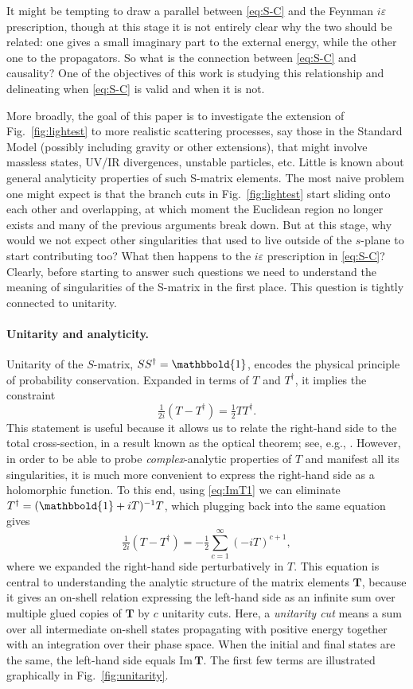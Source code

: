 \documentclass[12pt]{article}
\newcommand*{\boldone}{\mathbbold{1}}
\numberwithin{figure}{section}
\def \be {\begin{equation}}
\def \ee {\end{equation}}
\def \eps {\varepsilon}
\def \Im {\mathrm{Im}}
\begin{document}
    It might be tempting to draw a parallel between \eqref{eq:S-C} and the Feynman $i\eps$ prescription, though at this stage it is not entirely clear why the two should be related: one gives a small imaginary part to the external energy, while the other one to the propagators. So what is the connection between \eqref{eq:S-C} and causality? One of the objectives of this work is studying this relationship and delineating when \eqref{eq:S-C} is valid and when it is not.
    
    More broadly, the goal of this paper is to investigate the extension of Fig.~\ref{fig:lightest} to more realistic scattering processes, say those in the Standard Model (possibly including gravity or other extensions), that might involve massless states, UV/IR divergences, unstable particles, etc. Little is known about general analyticity properties of such S-matrix elements. The most naive problem one might expect is that the branch cuts in Fig.~\ref{fig:lightest} start sliding onto each other and overlapping, at which moment the Euclidean region no longer exists and many of the previous arguments break down. But at this stage, why would we not expect other singularities that used to live outside of the $s$-plane to start contributing too? What then happens to the $i\eps$ prescription in \eqref{eq:S-C}? Clearly, before starting to answer such questions we need to understand the meaning of singularities of the S-matrix in the first place. This question is tightly connected to unitarity.
	
	\paragraph{Unitarity and analyticity.}
	Unitarity of the $S$-matrix, $S S^\dagger = \boldone$, encodes the physical principle of probability conservation. Expanded in terms of $T$ and $T^\dagger$, it implies the constraint
	\be\label{eq:ImT1}
	\tfrac{1}{2i}(T - T^\dagger) = \tfrac{1}{2} T T^\dagger.
	\ee
	This statement is useful because it allows us to relate the right-hand side to the total cross-section, in a result known as the optical theorem; see, e.g., \cite{Itzykson:1980rh}. However, in order to be able to probe \emph{complex}-analytic properties of $T$ and manifest all its singularities, it is much more convenient to express the right-hand side as a holomorphic function. To this end, using \eqref{eq:ImT1} we can eliminate $T^\dagger = (\boldone+iT)^{-1}T$, which plugging back into the same equation gives
	\be\label{eq:ImT2}
	\tfrac{1}{2i}(T - T^\dagger) = -\tfrac{1}{2}\sum_{c=1}^{\infty} (-i T)^{c+1},
	\ee
	where we expanded the right-hand side perturbatively in $T$. This equation is central to understanding the analytic structure of the matrix elements $\mathbf{T}$, because it gives an on-shell relation expressing the left-hand side as an infinite sum over multiple glued copies of $\mathbf{T}$ by $c$ unitarity cuts. Here, a \emph{unitarity cut} means a sum over all intermediate on-shell states propagating with positive energy together with an integration over their phase space. When the initial and final states are the same, the left-hand side equals $\Im\, \mathbf{T}$.  The first few terms are illustrated graphically in Fig.~\ref{fig:unitarity}.
	
\end{document}
